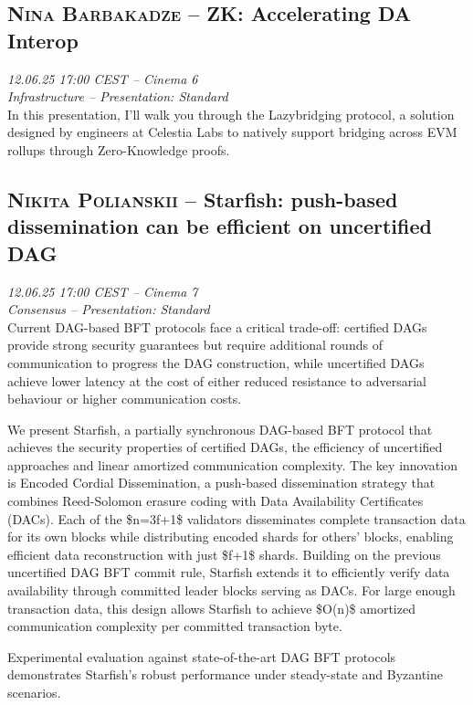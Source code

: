 \clearpage
\subsection {\textsc{Nina Barbakadze}  -- ZK: Accelerating DA Interop} \noindent \textit {12.06.25 17:00 CEST -- Cinema 6\\ Infrastructure -- Presentation: Standard}\\[1em] In this presentation, I’ll walk you through the Lazybridging protocol, a solution designed by engineers at Celestia Labs to natively support bridging across EVM rollups through Zero-Knowledge proofs.

\clearpage
\subsection {\textsc{Nikita Polianskii}  -- Starfish: push-based dissemination can be efficient on uncertified DAG} \noindent \textit {12.06.25 17:00 CEST -- Cinema 7\\ Consensus -- Presentation: Standard}\\[1em] Current DAG-based BFT protocols face a critical trade-off: certified DAGs provide strong security guarantees but require additional rounds of communication to progress the DAG construction, while uncertified DAGs achieve lower latency at the cost of either reduced resistance to adversarial behaviour or higher communication costs.

We present Starfish, a partially synchronous DAG-based BFT protocol that achieves the security properties of certified DAGs, the efficiency of uncertified approaches and linear amortized communication complexity. The key innovation is Encoded Cordial Dissemination, a push-based dissemination strategy that combines Reed-Solomon erasure coding with Data Availability Certificates (DACs). Each of the \$n=3f+1\$ validators disseminates complete transaction data for its own blocks while distributing encoded shards for others' blocks, enabling efficient data reconstruction with just \$f+1\$ shards. Building on the previous uncertified DAG BFT commit rule, Starfish extends it to efficiently verify data availability through committed leader blocks serving as DACs.  For large enough transaction data, this design allows Starfish to achieve \$O(n)\$ amortized communication complexity per committed transaction byte.

Experimental evaluation against state-of-the-art DAG BFT protocols demonstrates Starfish's robust performance under steady-state and Byzantine scenarios.

